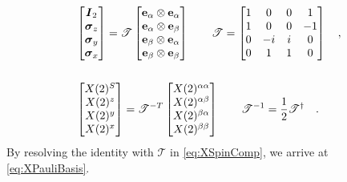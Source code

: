 \begin{subequations}
\begin{align}
\label{eq:BasisTrans}
&\begin{bmatrix}
  \vc{I}_2 \\
  \vc{\sigma}_z \\
  \vc{\sigma}_y \\
  \vc{\sigma}_x
\end{bmatrix} = \mathscr{T} 
\begin{bmatrix}
  \mathbf{e}_\alpha \otimes \mathbf{e}_\alpha  \\
  \mathbf{e}_\alpha \otimes \mathbf{e}_\beta  \\
  \mathbf{e}_\beta  \otimes \mathbf{e}_\alpha   \\
  \mathbf{e}_\beta  \otimes \mathbf{e}_\beta
\end{bmatrix} \qquad
%
\mathscr{T} = 
\begin{bmatrix}
1 &  0 & 0 &  1 \\
1 &  0 & 0 & -1 \\
0 & -i & i &  0 \\
0 &  1 & 1 &  0 \\
\end{bmatrix} \quad, \\
\nonumber\\
\label{eq:CompTrans}
&\begin{bmatrix}
  \spinor{2}{X}^S \\
  \spinor{2}{X}^z \\
  \spinor{2}{X}^y \\
  \spinor{2}{X}^x
\end{bmatrix} = \mathscr{T}^{-T} 
\begin{bmatrix}
  \spinor{2}{X}^{\alpha \alpha}  \\
  \spinor{2}{X}^{\alpha \beta} \\
  \spinor{2}{X}^{\beta  \alpha}   \\
  \spinor{2}{X}^{\beta  \beta}
\end{bmatrix} \qquad
%
\mathscr{T}^{-1} = \frac{1}{2} \mathscr{T}^\dagger \quad.
\end{align}
\end{subequations}
By resolving the identity with $\mathscr{T}$ in \cref{eq:XSpinComp}, we arrive at \cref{eq:XPauliBasis}.

